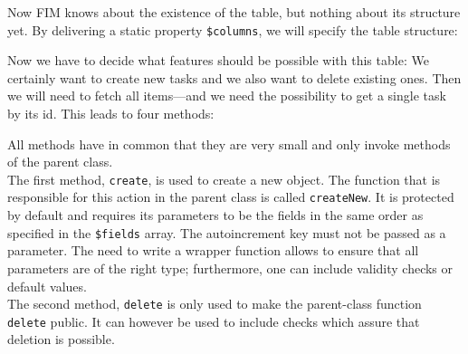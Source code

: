 \documentclass{scrartcl}
\begin{document}
      Now FIM knows about the existence of the table, but nothing about its structure yet. By delivering a static property \lstinline!$columns!, we will specify the table structure:
      Now we have to decide what features should be possible with this table: We certainly want to create new tasks and we also want to delete existing ones. Then we will need to fetch all items---and we need the possibility to get a single task by its id. This leads to four methods:
      All methods have in common that they are very small and only invoke methods of the parent class. \\
      The first method, \lstinline!create!, is used to create a new object. The function that is responsible for this action in the parent class is called \lstinline!createNew!. It is protected by default and requires its parameters to be the fields in the same order as specified in the \lstinline!$fields! array.
      The autoincrement key must not be passed as a parameter. The need to write a wrapper function allows to ensure that all parameters are of the right type; furthermore, one can include validity checks or default values. \\
      The second method, \lstinline!delete! is only used to make the parent-class function \lstinline!delete! public. It can however be used to include checks which assure that deletion is possible. \\
\end{document}
